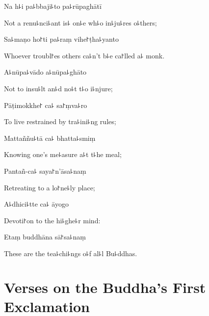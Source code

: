 Na h꜕i pa꜕bbaji꜕to pa꜕rūpaghātī

\begin{english}
  Not a renu꜕nci꜕ant is꜕ on꜕e wh꜕o in꜕ju꜕res o꜕thers;
\end{english}

Sa꜕maṇo ho꜓ti pa꜕raṃ vihe꜓ṭha꜕yanto

\begin{english}
  Whoever troubl꜓es others ca꜕n't b꜕e ca꜓lled a꜕ monk.
\end{english}

A꜕nūpa꜕vādo a꜕nūpa꜕ghāto

\begin{english}
  Not to insu꜕lt an꜕d no꜕t t꜕o i꜕njure;
\end{english}

Pāṭimokkhe꜓ ca꜕ sa꜓ṃva꜕ro

\begin{english}
  To live restrained by tra꜕ini꜕ng rules;
\end{english}

\clearpage

Mattaññu꜕tā ca꜕ bhatta꜕smiṃ

\begin{english}
  Knowing one's me꜕asure a꜕t t꜕he meal;
\end{english}

Pantañ-ca꜕ saya꜓n'āsa꜕naṃ

\begin{english}
  Retreating to a lo꜓ne꜕ly place;
\end{english}

A꜕dhici꜕tte ca꜕ āyogo

\begin{english}
  Devoti꜓on to the hi꜕ghe꜕r mind:
\end{english}

Etaṃ buddhāna sā꜓sa꜕naṃ

\begin{english}
  These are the tea꜕chi꜕ngs o꜕f al꜕l Bu꜕ddhas.
\end{english}

\chapter{Verses on the Buddha's First Exclamation}%

\begin{leader}
\end{leader}

